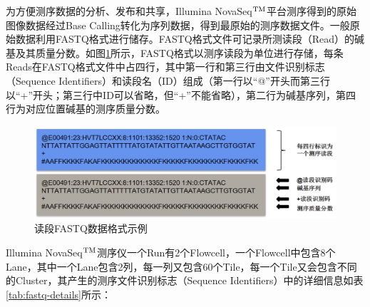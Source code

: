 \documentclass[
  a4paper,
  titlepage]{article}
\begin{document}
为方便测序数据的分析、发布和共享，Illumina NovaSeq\(\rm{^{TM}}\)平台测序得到的原始图像数据经过Base Calling转化为序列数据，得到最原始的测序数据文件。一般原始数据利用FASTQ格式进行储存。FASTQ格式文件可记录所测读段（Read）的碱基及其质量分数。如图\ref{fig:fastq-plot}所示，FASTQ格式以测序读段为单位进行存储，每条Reads在FASTQ格式文件中占四行，其中第一行和第三行由文件识别标志（Sequence Identifiers）和读段名（ID）组成（第一行以``@''开头而第三行以``+''开头；第三行中ID可以省略，但``+''不能省略），第二行为碱基序列，第四行为对应位置碱基的测序质量分数。

\begin{figure}[H]

{\centering \includegraphics[width=0.5\linewidth]{static/images/fastq} 

}

\caption{读段FASTQ数据格式示例}\label{fig:fastq-plot}
\end{figure}

Illumina NovaSeq\(\rm{^{TM}}\)测序仪一个Run有2个Flowcell，一个Flowcell中包含8个Lane，其中一个Lane包含2列，每一列又包含60个Tile，每一个Tile又会包含不同的Cluster，其产生的测序文件识别标志（Sequence Identifiers）中的详细信息如表\ref{tab:fastq-details}所示：
\end{document}
